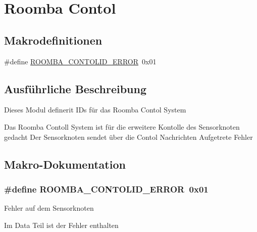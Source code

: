 \hypertarget{group__roomba__contol}{\section{Roomba Contol}
\label{group__roomba__contol}
}
\subsection*{Makrodefinitionen}
\begin{DoxyCompactItemize}
\item 
\#define \hyperlink{group__roomba__contol_ga73471faf57dbef86411795f303eb9914}{R\-O\-O\-M\-B\-A\-\_\-\-C\-O\-N\-T\-O\-L\-I\-D\-\_\-\-E\-R\-R\-O\-R}~0x01
\end{DoxyCompactItemize}


\subsection{Ausführliche Beschreibung}
Dieses Modul definerit I\-Ds für das Roomba Contol System

Das Roomba Contoll System ist für die erweitere Kontolle des Sensorknoten gedacht Der Sensorknoten sendet über die Contol Nachrichten Aufgetrete Fehler 

\subsection{Makro-\/\-Dokumentation}
\hypertarget{group__roomba__contol_ga73471faf57dbef86411795f303eb9914}{
\subsubsection[{R\-O\-O\-M\-B\-A\-\_\-\-C\-O\-N\-T\-O\-L\-I\-D\-\_\-\-E\-R\-R\-O\-R}]{\setlength{\rightskip}{0pt plus 5cm}\#define R\-O\-O\-M\-B\-A\-\_\-\-C\-O\-N\-T\-O\-L\-I\-D\-\_\-\-E\-R\-R\-O\-R~0x01}}\label{group__roomba__contol_ga73471faf57dbef86411795f303eb9914}
Fehler auf dem Sensorknoten

Im Data Teil ist der Fehler enthalten 